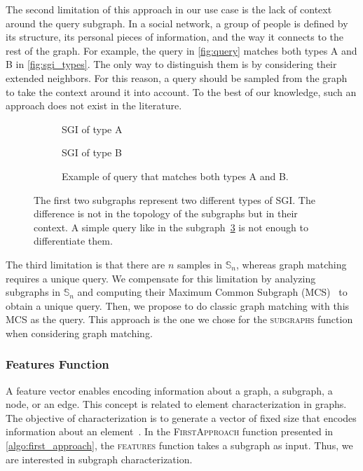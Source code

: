 \documentclass{llncs}
\begin{document}
The second limitation of this approach in our use case is the lack of context around the query subgraph.
In a social network, a group of people is defined by its structure, its personal pieces of information, and the way it connects to the rest of the graph.
For example, the query in \autoref{fig:query} matches both types A and B in \autoref{fig:sgi_types}.
The only way to distinguish them is by considering their extended neighbors.
For this reason, a query should be sampled from the graph to take the context around it into account.
To the best of our knowledge, such an approach does not exist in the literature.

\begin{figure}[htbp]
\centering

\begin{subfigure}{\textwidth}
\centering

\caption{SGI of type A}%
\label{fig:sgi_type_a}
\end{subfigure}

\begin{subfigure}{\textwidth}
\centering

\caption{SGI of type B}%
\label{fig:sgi_type_b}
\end{subfigure}

\begin{subfigure}{\textwidth}
\centering

\caption{Example of query that matches both types A and B.}%
\label{fig:query}
\end{subfigure}

\caption{
The first two subgraphs represent two different types of SGI.\@
The difference is not in the topology of the subgraphs but in their context.
A simple query like in the subgraph~\ref{fig:query} is not enough to differentiate them.
}%
\label{fig:sgi_types}
\end{figure}

The third limitation is that there are \(n\) samples in \(\mathbb{S}_n\), whereas graph matching requires a unique query.
We compensate for this limitation by analyzing subgraphs in \(\mathbb{S}_n\) and computing their Maximum Common Subgraph (MCS)~\cite{Roy2024} to obtain a unique query.
Then, we propose to do classic graph matching with this MCS as the query.
This approach is the one we chose for the \textsc{subgraphs} function when considering graph matching.

\subsubsection{Features Function}\label{sec:features}
A feature vector enables encoding information about a graph, a subgraph, a node, or an edge.
This concept is related to element characterization in graphs.
The objective of characterization is to generate a vector of fixed size that encodes information about an element~\cite{Li2012,Perozzi2014,Alsentzer2020,Grover2016,Narayanan2017}.
In the \textsc{FirstApproach} function presented in \autoref{algo:first_approach}, the \textsc{features} function takes a subgraph as input.
Thus, we are interested in subgraph characterization.
\end{document}
